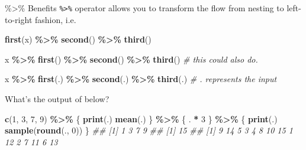 \documentclass[
  10pt,
  ignorenonframetext,
  serif]{beamer}
\newenvironment{Shaded}{\begin{snugshade}}{\end{snugshade}}
\newcommand{\CommentTok}[1]{\textcolor[rgb]{0.56,0.35,0.01}{\textit{#1}}}
\newcommand{\DecValTok}[1]{\textcolor[rgb]{0.00,0.00,0.81}{#1}}
\newcommand{\KeywordTok}[1]{\textcolor[rgb]{0.13,0.29,0.53}{\textbf{#1}}}
\newcommand{\NormalTok}[1]{#1}
\newcommand{\OperatorTok}[1]{\textcolor[rgb]{0.81,0.36,0.00}{\textbf{#1}}}
\newcommand{\StringTok}[1]{\textcolor[rgb]{0.31,0.60,0.02}{#1}}
\begin{document}
\begin{frame}[fragile]{\%\textgreater\% Benefits}
\protect\hypertarget{benefits}{}
\texttt{\%\textgreater{}\%} operator allows you to transform the flow
from nesting to left-to-right fashion, i.e.

\begin{Shaded}
\begin{Highlighting}[]
\KeywordTok{first}\NormalTok{(x) }\OperatorTok{\%\textgreater{}\%}\StringTok{ }\KeywordTok{second}\NormalTok{() }\OperatorTok{\%\textgreater{}\%}\StringTok{ }\KeywordTok{third}\NormalTok{()}

\NormalTok{x }\OperatorTok{\%\textgreater{}\%}\StringTok{ }\KeywordTok{first}\NormalTok{() }\OperatorTok{\%\textgreater{}\%}\StringTok{ }\KeywordTok{second}\NormalTok{() }\OperatorTok{\%\textgreater{}\%}\StringTok{ }\KeywordTok{third}\NormalTok{() }\CommentTok{\# this could also do.}

\NormalTok{x }\OperatorTok{\%\textgreater{}\%}\StringTok{ }\KeywordTok{first}\NormalTok{(.) }\OperatorTok{\%\textgreater{}\%}\StringTok{ }\KeywordTok{second}\NormalTok{(.) }\OperatorTok{\%\textgreater{}\%}\StringTok{ }\KeywordTok{third}\NormalTok{(.) }\CommentTok{\# . represents the input}
\end{Highlighting}
\end{Shaded}

What's the output of below?

\begin{Shaded}
\begin{Highlighting}[]
\KeywordTok{c}\NormalTok{(}\DecValTok{1}\NormalTok{, }\DecValTok{3}\NormalTok{, }\DecValTok{7}\NormalTok{, }\DecValTok{9}\NormalTok{) }\OperatorTok{\%\textgreater{}\%}\StringTok{ }\NormalTok{\{}
  \KeywordTok{print}\NormalTok{(.)}
  \KeywordTok{mean}\NormalTok{(.)}
\NormalTok{\} }\OperatorTok{\%\textgreater{}\%}\StringTok{ }\NormalTok{\{ . }\OperatorTok{*}\StringTok{ }\DecValTok{3}\NormalTok{ \} }\OperatorTok{\%\textgreater{}\%}\StringTok{ }\NormalTok{\{}
  \KeywordTok{print}\NormalTok{(.)}
  \KeywordTok{sample}\NormalTok{(}\KeywordTok{round}\NormalTok{(., }\DecValTok{0}\NormalTok{))}
\NormalTok{\}}
\CommentTok{\#\# [1] 1 3 7 9}
\CommentTok{\#\# [1] 15}
\CommentTok{\#\#  [1]  9 14  5  3  4  8 10 15  1 12  2  7 11  6 13}
\end{Highlighting}
\end{Shaded}
\end{frame}
\end{document}
